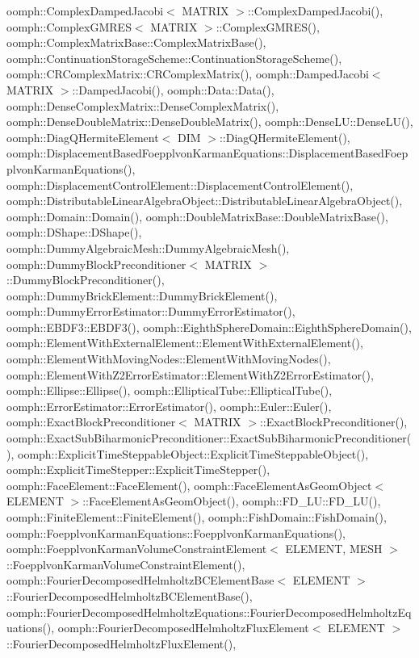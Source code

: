 oomph\+::\+Complex\+Damped\+Jacobi$<$ M\+A\+T\+R\+I\+X $>$\+::\+Complex\+Damped\+Jacobi(), oomph\+::\+Complex\+G\+M\+R\+E\+S$<$ M\+A\+T\+R\+I\+X $>$\+::\+Complex\+G\+M\+R\+E\+S(), oomph\+::\+Complex\+Matrix\+Base\+::\+Complex\+Matrix\+Base(), oomph\+::\+Continuation\+Storage\+Scheme\+::\+Continuation\+Storage\+Scheme(), oomph\+::\+C\+R\+Complex\+Matrix\+::\+C\+R\+Complex\+Matrix(), oomph\+::\+Damped\+Jacobi$<$ M\+A\+T\+R\+I\+X $>$\+::\+Damped\+Jacobi(), oomph\+::\+Data\+::\+Data(), oomph\+::\+Dense\+Complex\+Matrix\+::\+Dense\+Complex\+Matrix(), oomph\+::\+Dense\+Double\+Matrix\+::\+Dense\+Double\+Matrix(), oomph\+::\+Dense\+L\+U\+::\+Dense\+L\+U(), oomph\+::\+Diag\+Q\+Hermite\+Element$<$ D\+I\+M $>$\+::\+Diag\+Q\+Hermite\+Element(), oomph\+::\+Displacement\+Based\+Foepplvon\+Karman\+Equations\+::\+Displacement\+Based\+Foepplvon\+Karman\+Equations(), oomph\+::\+Displacement\+Control\+Element\+::\+Displacement\+Control\+Element(), oomph\+::\+Distributable\+Linear\+Algebra\+Object\+::\+Distributable\+Linear\+Algebra\+Object(), oomph\+::\+Domain\+::\+Domain(), oomph\+::\+Double\+Matrix\+Base\+::\+Double\+Matrix\+Base(), oomph\+::\+D\+Shape\+::\+D\+Shape(), oomph\+::\+Dummy\+Algebraic\+Mesh\+::\+Dummy\+Algebraic\+Mesh(), oomph\+::\+Dummy\+Block\+Preconditioner$<$ M\+A\+T\+R\+I\+X $>$\+::\+Dummy\+Block\+Preconditioner(), oomph\+::\+Dummy\+Brick\+Element\+::\+Dummy\+Brick\+Element(), oomph\+::\+Dummy\+Error\+Estimator\+::\+Dummy\+Error\+Estimator(), oomph\+::\+E\+B\+D\+F3\+::\+E\+B\+D\+F3(), oomph\+::\+Eighth\+Sphere\+Domain\+::\+Eighth\+Sphere\+Domain(), oomph\+::\+Element\+With\+External\+Element\+::\+Element\+With\+External\+Element(), oomph\+::\+Element\+With\+Moving\+Nodes\+::\+Element\+With\+Moving\+Nodes(), oomph\+::\+Element\+With\+Z2\+Error\+Estimator\+::\+Element\+With\+Z2\+Error\+Estimator(), oomph\+::\+Ellipse\+::\+Ellipse(), oomph\+::\+Elliptical\+Tube\+::\+Elliptical\+Tube(), oomph\+::\+Error\+Estimator\+::\+Error\+Estimator(), oomph\+::\+Euler\+::\+Euler(), oomph\+::\+Exact\+Block\+Preconditioner$<$ M\+A\+T\+R\+I\+X $>$\+::\+Exact\+Block\+Preconditioner(), oomph\+::\+Exact\+Sub\+Biharmonic\+Preconditioner\+::\+Exact\+Sub\+Biharmonic\+Preconditioner(), oomph\+::\+Explicit\+Time\+Steppable\+Object\+::\+Explicit\+Time\+Steppable\+Object(), oomph\+::\+Explicit\+Time\+Stepper\+::\+Explicit\+Time\+Stepper(), oomph\+::\+Face\+Element\+::\+Face\+Element(), oomph\+::\+Face\+Element\+As\+Geom\+Object$<$ E\+L\+E\+M\+E\+N\+T $>$\+::\+Face\+Element\+As\+Geom\+Object(), oomph\+::\+F\+D\+\_\+\+L\+U\+::\+F\+D\+\_\+\+L\+U(), oomph\+::\+Finite\+Element\+::\+Finite\+Element(), oomph\+::\+Fish\+Domain\+::\+Fish\+Domain(), oomph\+::\+Foepplvon\+Karman\+Equations\+::\+Foepplvon\+Karman\+Equations(), oomph\+::\+Foepplvon\+Karman\+Volume\+Constraint\+Element$<$ E\+L\+E\+M\+E\+N\+T, M\+E\+S\+H $>$\+::\+Foepplvon\+Karman\+Volume\+Constraint\+Element(), oomph\+::\+Fourier\+Decomposed\+Helmholtz\+B\+C\+Element\+Base$<$ E\+L\+E\+M\+E\+N\+T $>$\+::\+Fourier\+Decomposed\+Helmholtz\+B\+C\+Element\+Base(), oomph\+::\+Fourier\+Decomposed\+Helmholtz\+Equations\+::\+Fourier\+Decomposed\+Helmholtz\+Equations(), oomph\+::\+Fourier\+Decomposed\+Helmholtz\+Flux\+Element$<$ E\+L\+E\+M\+E\+N\+T $>$\+::\+Fourier\+Decomposed\+Helmholtz\+Flux\+Element(), 